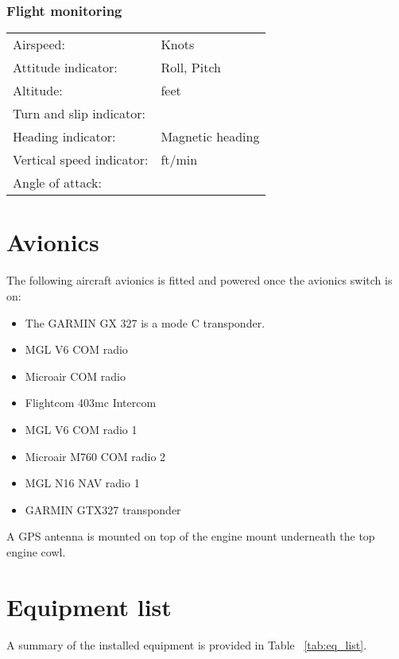 \subsubsection{Flight monitoring}
  \begin{tabularx}{\linewidth}{
    >{\hsize=0.4\hsize}X
    >{\hsize=0.6\hsize}X  }
Airspeed: & Knots\\
Attitude indicator: & Roll, Pitch\\
Altitude: & feet\\
Turn and slip indicator: & \\
Heading indicator: & Magnetic heading\\
Vertical speed indicator: & ft/min\\
Angle of attack: & \\
\end{tabularx}

\section{Avionics}
The following aircraft avionics is fitted and powered once the avionics switch is on:
\begin{itemize}
\item The GARMIN GX 327 is a mode C transponder.
\item MGL V6 COM radio
\item Microair COM radio
\item Flightcom 403mc Intercom 
\item MGL V6 COM radio 1
\item Microair M760 COM radio 2
\item MGL N16 NAV radio 1
\item GARMIN GTX327 transponder
\end{itemize}

A GPS antenna is mounted on top of the engine mount underneath the top engine cowl.  

\section{Equipment list}
A summary of the installed equipment is provided in Table ~\ref{tab:eq_list}.  

